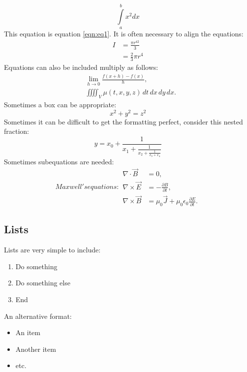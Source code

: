 \documentclass[a4paper,12pt]{article}
\begin{document}
\begin{equation}
\int\limits_{a}^{b} x^2 dx
\label{eqn:eq1}
\end{equation}
This equation is equation \ref{eqn:eq1}.
It is often necessary to align the equations:
\begin{equation} \label{eq2}
\begin{split}
I & = \frac{\pi r^42}{3} \\
   & = \frac{2}{3} \pi r^4
\end{split}
\end{equation}
Equations can also be included multiply as follows:
\begin{align}
&\lim_{h \rightarrow 0 } \frac{f(x+h)-f(x)}{h},\nonumber \\
&\iiiint_V \mu(t,x,y,z) \,dt\,dx\,dy\,dx.
\end{align}
Sometimes a box can be appropriate:
\begin{equation}
 \boxed{x^2+y^2 = z^2}
\end{equation}
Sometimes it can be difficult to get the formatting perfect, consider this nested fraction:
\begin{equation}
  y = x_0 + \frac{1}{\displaystyle x_1
          + \frac{1}{\displaystyle x_2 
          + \frac{1}{\displaystyle x_3 + x_4}}} \nonumber
\end{equation}
Sometimes subequations are needed:
\begin{subequations}
Maxwell's equations:
\begin{align}
        \nabla \cdot \vec{B} &= 0, \\
\nabla \times \vec{E} &= - \frac{\partial B}{\partial t}, \\
\nabla \times \vec{B} &= \mu_{0}\vec{J} +
\mu_{0}\epsilon_{0}\frac{\partial E}{\partial t}.
\end{align}
\end{subequations}
\subsection{Lists}
Lists are very simple to include:
\begin{enumerate}
	\item Do something
	\item Do something else
	\item End
\end{enumerate}
An alternative format:
\begin{itemize}
	\item An item
	\item Another item
	\item etc.
\end{itemize}
\end{document}
